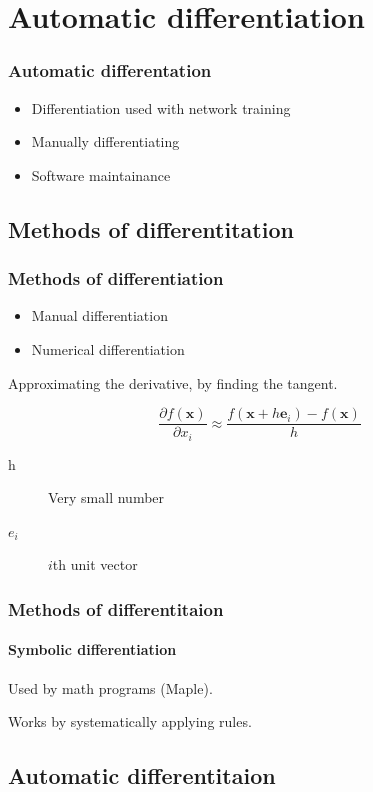 \documentclass{beamer}
\begin{document}
\section{Automatic differentiation}

\begin{frame}
    \frametitle{Automatic differentation}
    
    \begin{itemize}
        \item Differentiation used with network training
        \item Manually differentiating
        \item Software maintainance
    \end{itemize}
\end{frame}

\subsection{Methods of differentitation}

\begin{frame}
    \frametitle{Methods of differentiation}
    
    \begin{itemize}
        \item Manual differentiation
        \pause
        \item Numerical differentiation
    \end{itemize}

    Approximating the derivative, by finding the tangent.

    $$\frac{\partial f(\bm{x})}{\partial x_i} \approx \frac{f(\bm{x} + h\bm{e}_i) - f(\bm{x})}{h}$$

    \begin{description}
        \item[h] Very small number
        \item[$e_i$] $i$th unit vector
    \end{description}
\end{frame}

\begin{frame}
    \frametitle{Methods of differentitaion}
    \framesubtitle{Symbolic differentiation}
    
    Used by math programs (Maple).

    Works by systematically applying rules.
\end{frame}

\subsection{Automatic differentitaion}
\end{document}
